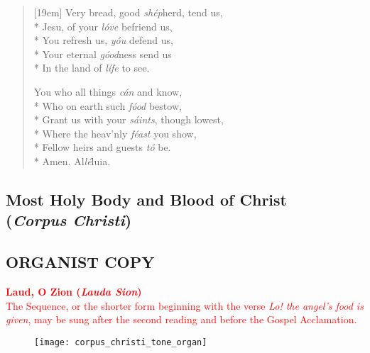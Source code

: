 \documentclass[12pt]{memoir}
\begin{document}
\begin{multicols}{2}
\begin{verse}[19em]
Very bread, good \textit{sh\'{e}p}herd, tend us, \\*
Jesu, of your \textit{l\'{o}ve} befriend us, \\*
You refresh us, \textit{y\'{o}u} defend us, \\*
Your eternal \textit{g\'{o}od}ness send us \\*
In the land of \textit{l\'{i}fe} to see.

You who all things \textit{c\'{a}n} and know, \\*
Who on earth such \textit{f\'{o}od} bestow, \\*
Grant us with your \textit{s\'{a}ints}, though lowest, \\*
Where the heav'nly \textit{f\'{e}ast} you show, \\*
Fellow heirs and guests \textit{t\'{o}} be. \\*
Amen. Al\textit{l\'{e}}luia.

\end{verse}
\end{multicols}

\clearpage

\subsection*{Most Holy Body and Blood of Christ \\ (\textit{Corpus Christi})}
\subsection*{ORGANIST COPY}
\vspace{1em}

\begin{center}

	\textcolor{red}{\textbf{Laud, O Zion (\textit{Lauda Sion})}} \\
	\textcolor{red}{The Sequence, or the shorter form beginning with the verse \textit{Lo! the angel's food is given}, may be sung after the second reading and before the Gospel Acclamation.} \\[1em]

	\begin{figure}[!h]
		\texttt{[image: corpus\_christi\_tone\_organ]}
	\end{figure} 
	
\end{center}
\end{document}
